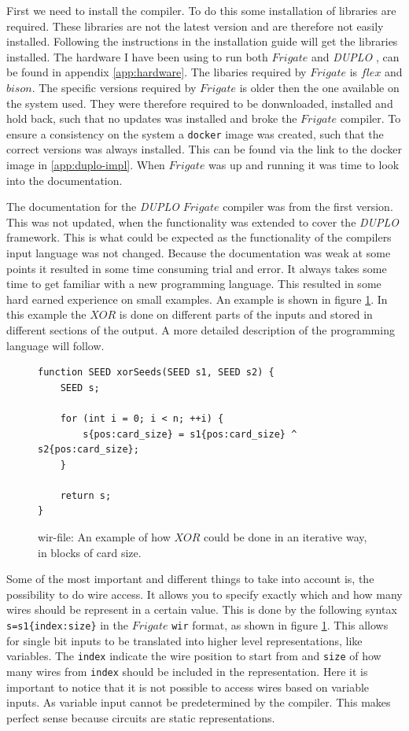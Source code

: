 \documentclass[twoside,11pt,openright]{report}
\newcommand{\DUPLO}{\textit{DUPLO} }
\begin{document}
First we need to install the compiler. To do this some installation of libraries are required. These libraries are not the latest version and are therefore not easily installed. Following the instructions in the installation guide will get the libraries installed. The hardware I have been using to run both $Frigate$ and \DUPLO, can be found in appendix \ref{app:hardware}. The libaries required by $Frigate$ is $flex$ and $bison$. The specific versions required by $Frigate$ is older then the one available on the system used. They were therefore required to be donwnloaded, installed and hold back, such that no updates was installed and broke the $Frigate$ compiler. To ensure a consistency on the system a \verb|docker| image was created, such that the correct versions was always installed. This can be found via the link to the docker image in \ref{app:duplo-impl}. When $Frigate$ was up and running it was time to look into the documentation.

The documentation for the \DUPLO $Frigate$ compiler was from the first version. This was not updated, when the functionality was extended to cover the \DUPLO framework. This is what could be expected as the functionality of the compilers input language was not changed. Because the documentation was weak at some points it resulted in some time consuming trial and error. It always takes some time to get familiar with a new programming language. This resulted in some hard earned experience on small examples. An example is shown in figure \ref{fig:wir_ex}. In this example the $XOR$ is done on different parts of the inputs and stored in different sections of the output. A more detailed description of the programming language will follow.

\begin{figure}[t]
\begin{verbatim}
function SEED xorSeeds(SEED s1, SEED s2) {
    SEED s;
    
    for (int i = 0; i < n; ++i) {
        s{pos:card_size} = s1{pos:card_size} ^ s2{pos:card_size};
    }

    return s;
}
\end{verbatim}
\caption{wir-file: An example of how $XOR$ could be done in an iterative way, in blocks of card size.}
\label{fig:wir_ex}
\end{figure}

Some of the most important and different things to take into account is, the possibility to do wire access. It allows you to specify exactly which and how many wires should be represent in a certain value. This is done by the following syntax \verb|s=s1{index:size}| in the $Frigate$ \verb|wir| format, as shown in figure \ref{fig:wir_ex}. This allows for single bit inputs to be translated into higher level representations, like variables. The \verb|index| indicate the wire position to start from and \verb|size| of how many wires from \verb|index| should be included in the representation. Here it is important to notice that it is not possible to access wires based on variable inputs. As variable input cannot be predetermined by the compiler. This makes perfect sense because circuits are static representations.
\end{document}
